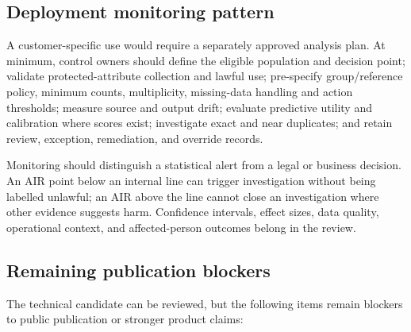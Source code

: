 \subsection{Deployment monitoring pattern}

A customer-specific use would require a separately approved analysis plan. At minimum, control
owners should define the eligible population and decision point; validate protected-attribute
collection and lawful use; pre-specify group/reference policy, minimum counts, multiplicity,
missing-data handling and action thresholds; measure source and output drift; evaluate predictive
utility and calibration where scores exist; investigate exact and near duplicates; and retain
review, exception, remediation, and override records.

Monitoring should distinguish a statistical alert from a legal or business decision. An AIR point
below an internal line can trigger investigation without being labelled unlawful; an AIR above the
line cannot close an investigation where other evidence suggests harm. Confidence intervals,
effect sizes, data quality, operational context, and affected-person outcomes belong in the review.

\subsection{Remaining publication blockers}

The technical candidate can be reviewed, but the following items remain blockers to public
publication or stronger product claims:

